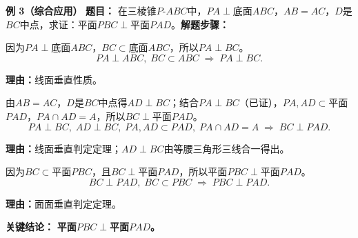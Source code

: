 \begin{examplebox}
	\medskip
	\textbf{\textcolor{CExample}{例 3（综合应用）}}
	\textbf{\textcolor{CExample}{题目：}} 在三棱锥$P\text{-}ABC$中，$PA\perp$底面$ABC$，$AB=AC$，$D$是$BC$中点，求证：平面$PBC\perp$平面$PAD$。\textbf{\textcolor{CExample}{解题步骤：}}
	\begin{description}[style=nextline, leftmargin=2.8em, labelsep=0.5em, itemsep=0.45em]
		\item[\textbf{第一步（线面垂直到线线）：}]
			因为$PA\perp$底面$ABC$，$BC\subset$底面$ABC$，所以$PA\perp BC$。
			\[
				PA\perp ABC,\; BC\subset ABC \;\Rightarrow\; PA\perp BC.
			\]
			\par\textbf{理由：}线面垂直性质。
		\item[\textbf{第二步（线线垂直到线面）：}]
			由$AB=AC$，$D$是$BC$中点得$AD\perp BC$；结合$PA\perp BC$（已证），$PA,AD\subset$平面$PAD$，$PA\cap AD=A$，所以$BC\perp$平面$PAD$。
			\[
				PA\perp BC,\; AD\perp BC,\; PA,AD\subset PAD,\; PA\cap AD=A \;\Rightarrow\; BC\perp PAD.
			\]
			\par\textbf{理由：}线面垂直判定定理；$AD\perp BC$由等腰三角形三线合一得出。
		\item[\textbf{第三步（线面垂直到面面）：}]
			因为$BC\subset$平面$PBC$，且$BC\perp$平面$PAD$，所以平面$PBC\perp$平面$PAD$。
			\[
				BC\perp PAD,\; BC\subset PBC \;\Rightarrow\; PBC\perp PAD.
			\]
			\par\textbf{理由：}面面垂直判定定理。
	\end{description}
	\textbf{\textcolor{CExample}{关键结论：}}
	\textbf{平面$PBC\perp$平面$PAD$。}
\end{examplebox}
